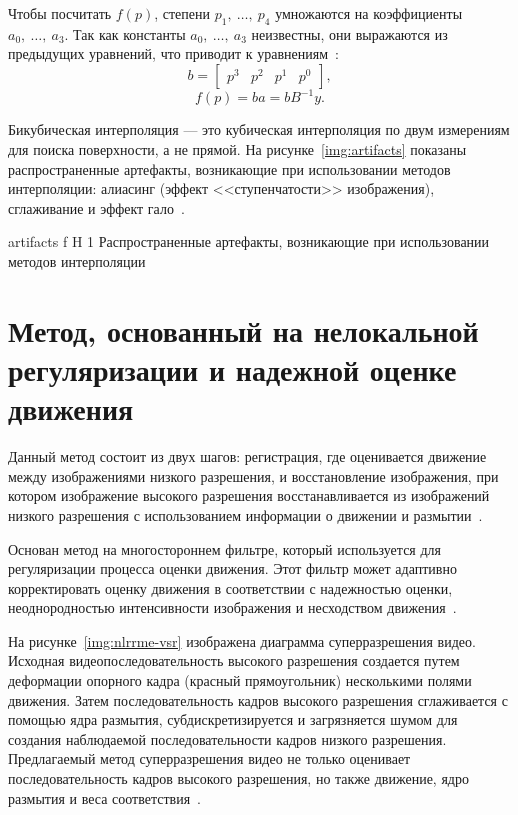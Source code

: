 \documentclass{bmstu}
\begin{document}
Чтобы посчитать $f(p)$, степени $p_1,~\dots,~p_4$ умножаются на коэффициенты $a_0,~\dots,~a_3$. 
Так как константы $a_0,~\dots,~a_3$ неизвестны, они выражаются из предыдущих уравнений, что приводит к уравнениям~\cite{Bavenstrand2021}:
\begin{equation}
b = \begin{bmatrix}
p^3 & p^2 & p^1 & p^0
\end{bmatrix},
\end{equation}
\begin{equation}
f(p) = ba = bB^{-1}y.
\end{equation}

Бикубическая интерполяция --- это кубическая интерполяция по двум измерениям для поиска поверхности, а не прямой. 
На рисунке~\ref{img:artifacts} показаны распространенные артефакты, возникающие при использовании методов интерполяции: алиасинг (эффект <<ступенчатости>> изображения), сглаживание и эффект гало~\cite{Bavenstrand2021}.

    {artifacts}
    {f}
    {H}
    {1\textwidth}
    {Распространенные артефакты, возникающие при использовании методов интерполяции~\cite{Bavenstrand2021}}

\section{Метод, основанный на нелокальной регуляризации и надежной оценке движения}

Данный метод состоит из двух шагов: регистрация, где оценивается движение между изображениями низкого разрешения, и восстановление изображения, при котором изображение высокого разрешения восстанавливается из изображений низкого разрешения с использованием информации о движении и размытии~\cite{Jian2014}.

Основан метод на многостороннем фильтре, который используется для регуляризации процесса оценки движения. 
Этот фильтр может адаптивно корректировать оценку движения в соответствии с надежностью оценки, неоднородностью интенсивности изображения и несходством движения~\cite{Jian2014}.

На рисунке~\ref{img:nlrrme-vsr} изображена диаграмма суперразрешения видео. 
Исходная видеопоследовательность высокого разрешения создается путем деформации опорного кадра (красный прямоугольник) несколькими полями движения. 
Затем последовательность кадров высокого разрешения сглаживается с помощью ядра размытия, субдискретизируется и загрязняется шумом для создания наблюдаемой последовательности кадров низкого разрешения. 
Предлагаемый метод суперразрешения видео не только оценивает последовательность кадров высокого разрешения, но также движение, ядро размытия и веса соответствия~\cite{Jian2014}.
\end{document}
